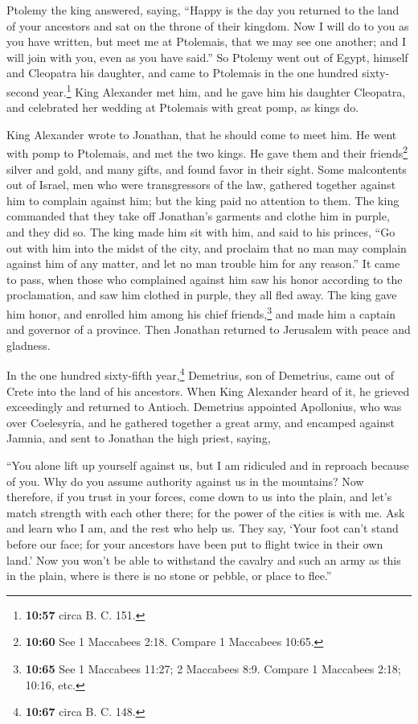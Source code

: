  Ptolemy the king answered, saying, ``Happy is the day
you returned to the land of your ancestors and sat on the throne of
their kingdom.  Now I will do to you as you have written,
but meet me at Ptolemais, that we may see one another; and I will join
with you, even as you have said.''  So Ptolemy went out
of Egypt, himself and Cleopatra his daughter, and came to Ptolemais in
the one hundred sixty-second year.\footnote{\textbf{10:57} circa B. C.
  151.}  King Alexander met him, and he gave him his
daughter Cleopatra, and celebrated her wedding at Ptolemais with great
pomp, as kings do.

 King Alexander wrote to Jonathan, that he should come to
meet him.  He went with pomp to Ptolemais, and met the
two kings. He gave them and their friends\footnote{\textbf{10:60} See 1
  Maccabees 2:18. Compare 1 Maccabees 10:65.} silver and gold, and many
gifts, and found favor in their sight.  Some malcontents
out of Israel, men who were transgressors of the law, gathered together
against him to complain against him; but the king paid no attention to
them.  The king commanded that they take off Jonathan's
garments and clothe him in purple, and they did so.  The
king made him sit with him, and said to his princes, ``Go out with him
into the midst of the city, and proclaim that no man may complain
against him of any matter, and let no man trouble him for any reason.''
 It came to pass, when those who complained against him
saw his honor according to the proclamation, and saw him clothed in
purple, they all fled away.  The king gave him honor, and
enrolled him among his chief friends,\footnote{\textbf{10:65} See 1
  Maccabees 11:27; 2 Maccabees 8:9. Compare 1 Maccabees 2:18; 10:16,
  etc.} and made him a captain and governor of a province.
 Then Jonathan returned to Jerusalem with peace and
gladness.

 In the one hundred sixty-fifth year,\footnote{\textbf{10:67}
  circa B. C. 148.} Demetrius, son of Demetrius, came out of Crete into
the land of his ancestors.  When King Alexander heard of
it, he grieved exceedingly and returned to Antioch. 
Demetrius appointed Apollonius, who was over Coelesyria, and he gathered
together a great army, and encamped against Jamnia, and sent to Jonathan
the high priest, saying,

 ``You alone lift up yourself against us, but I am
ridiculed and in reproach because of you. Why do you assume authority
against us in the mountains?  Now therefore, if you trust
in your forces, come down to us into the plain, and let's match strength
with each other there; for the power of the cities is with me.
 Ask and learn who I am, and the rest who help us. They
say, `Your foot can't stand before our face; for your ancestors have
been put to flight twice in their own land.'  Now you
won't be able to withstand the cavalry and such an army as this in the
plain, where is there is no stone or pebble, or place to flee.''

